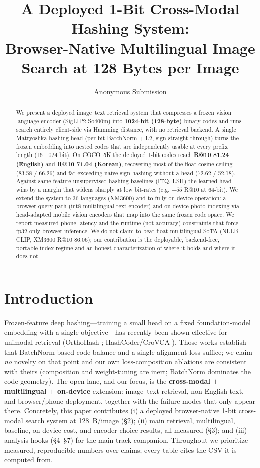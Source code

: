 \documentclass[letterpaper]{article} %
\title{A Deployed 1-Bit Cross-Modal Hashing System:\\
Browser-Native Multilingual Image Search at 128 Bytes per Image}
\author{Anonymous Submission}
\begin{document}
\maketitle

\begin{abstract}
We present a deployed image--text retrieval system that compresses a frozen vision--language
encoder (SigLIP2-So400m) into \textbf{1024-bit (128-byte)} binary codes and runs search entirely
client-side via Hamming distance, with no retrieval backend. A single Matryoshka hashing head
(per-bit BatchNorm $+$ L2, sign straight-through) turns the frozen embedding into nested codes that
are independently usable at every prefix length (16--1024 bit). On COCO~5K the deployed 1-bit codes
reach \textbf{R@10 81.24 (English)} and \textbf{R@10 71.04 (Korean)}, recovering most of the
float-cosine ceiling (83.58 / 66.26) and far exceeding naive sign hashing without a head
(72.62 / 52.18). Against same-feature unsupervised hashing baselines (ITQ, LSH) the learned head
wins by a margin that widens sharply at low bit-rates (e.g. $+55$ R@10 at 64-bit). We extend the
system to 36 languages (XM3600) and to fully on-device operation: a browser query path
(int8 multilingual text encoder) and on-device photo indexing via head-adapted mobile vision
encoders that map into the same frozen code space. We report measured phone latency and the
runtime (not accuracy) constraints that force fp32-only browser inference. We do not claim to beat
float multilingual SoTA (NLLB-CLIP, XM3600 R@10 86.06); our contribution is the deployable,
backend-free, portable-index regime and an honest characterization of where it holds and where it
does not.
\end{abstract}

\section{Introduction}
Frozen-feature deep hashing---training a small head on a fixed foundation-model embedding with a
single objective---has recently been shown effective for unimodal retrieval (OrthoHash
\cite{orthohash}; HashCoder/CroVCA \cite{crovca}). Those works establish that BatchNorm-based code
balance and a single alignment loss suffice; we claim \emph{no} novelty on that point and our own
loss-composition ablations are consistent with theirs (composition and weight-tuning are inert;
BatchNorm dominates the code geometry). The open lane, and our focus, is the \textbf{cross-modal
$+$ multilingual $+$ on-device} extension: image--text retrieval, non-English text, and
browser/phone deployment, together with the failure modes that only appear there. Concretely, this
paper contributes (i) a deployed browser-native 1-bit cross-modal search system at 128~B/image
(\S2); (ii) main retrieval, multilingual, baseline, on-device-cost, and encoder-choice results,
all measured (\S3); and (iii) analysis hooks (\S4--\S7) for the main-track companion. Throughout we
prioritize measured, reproducible numbers over claims; every table cites the CSV it is computed
from.
\end{document}
